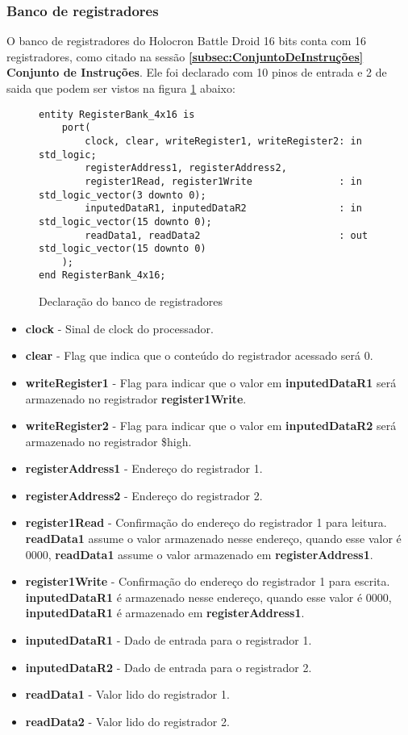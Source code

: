 \documentclass{article}
\newcommand\tab[1][0.50cm]{\hspace*{#1}}
\begin{document}
			\subsubsection[Banco de registradores]{Banco de registradores}
				\tab O banco de registradores do Holocron Battle Droid 16 bits conta com 16 registradores, como citado na sess\~{a}o \textbf{\ref{subsec:ConjuntoDeInstruções} Conjunto de Instru\c{c}\~{o}es}. Ele foi declarado com 10 pinos de entrada e 2 de saida que podem ser vistos na figura \ref{fig:RegisterBank_4x16} abaixo:
			\begin{figure}[H]
				\centering
				\caption[Banco de registradores]{Declara\c{c}\~{a}o do banco de registradores}
				\label{fig:RegisterBank_4x16}
				\begin{lstlisting}[style=vhdl]
entity RegisterBank_4x16 is 
	port(
		clock, clear, writeRegister1, writeRegister2: in  std_logic;
		registerAddress1, registerAddress2, 
		register1Read, register1Write				: in  std_logic_vector(3 downto 0);
		inputedDataR1, inputedDataR2 				: in  std_logic_vector(15 downto 0);
		readData1, readData2						: out std_logic_vector(15 downto 0)
	);
end RegisterBank_4x16;
				\end{lstlisting}
			\end{figure}
			\begin{itemize}
				\item \textbf{clock} - Sinal de clock do processador.
				\item \textbf{clear} - Flag que indica que o conte\'{u}do do registrador acessado ser\'{a} 0.
				\item \textbf{writeRegister1} - Flag para indicar que o valor em \textbf{inputedDataR1} ser\'{a} armazenado no registrador \textbf{register1Write}.
				\item \textbf{writeRegister2} - Flag para indicar que o valor em \textbf{inputedDataR2} ser\'{a} armazenado no registrador \$high.
				\item \textbf{registerAddress1} - Endere\c{c}o do registrador 1.
				\item \textbf{registerAddress2} - Endere\c{c}o do registrador 2.
				\item \textbf{register1Read} - Confirma\c{c}\~{a}o do endere\c{c}o do registrador 1 para leitura. \textbf{readData1} assume o valor armazenado nesse endere\c{c}o, quando esse valor \'{e} 0000, \textbf{readData1} assume o valor armazenado em \textbf{registerAddress1}.
				\item \textbf{register1Write} - Confirma\c{c}\~{a}o do endere\c{c}o do registrador 1 para escrita. \textbf{inputedDataR1} \'{e} armazenado nesse endere\c{c}o, quando esse valor \'{e} 0000, \textbf{inputedDataR1} \'{e} armazenado em \textbf{registerAddress1}.
				\item \textbf{inputedDataR1} - Dado de entrada para o registrador 1.
				\item \textbf{inputedDataR2} - Dado de entrada para o registrador 2.
				\item \textbf{readData1} - Valor lido do registrador 1.
				\item \textbf{readData2} - Valor lido do registrador 2.
			\end{itemize}
\end{document}
